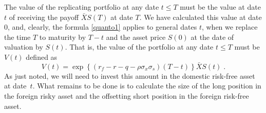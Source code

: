 The value of the replicating portfolio at any date $t\leq T$ must be the value at date $t$ of receiving the payoff $\bar{X}S(T)$ at date $T$.  We have calculated this value at date 0, and, clearly, the formula \eqref{quanto1} applies to general dates $t$, when we replace the time $T$ to maturity by $T-t$ and the asset price $S(0)$ at the date of valuation by $S(t)$.  That is, the value of the portfolio at any date $t\leq T$ must be $V(t)$ defined as
\begin{equation}\label{quanto2}
V(t) = \exp\left\{(r_f - r-q-\rho\sigma_x\sigma_s)(T-t)\right\}\bar{X}S(t)\;.
\end{equation}
As just noted, we will need to invest this amount in the domestic risk-free asset at date~$t$.  What remains to be done is to calculate the size of the long position in the foreign risky asset and the offsetting short position in the foreign risk-free asset.

